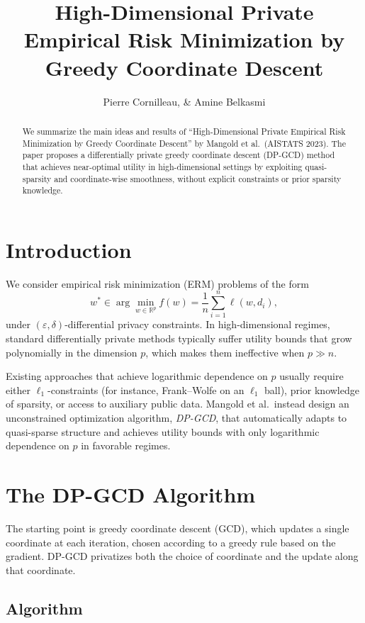 \documentclass[11pt,a4paper]{article}
\title{High-Dimensional Private Empirical Risk Minimization by Greedy Coordinate Descent}
\author{Pierre Cornilleau, \& Amine Belkasmi}
\date{}
\begin{document}
\maketitle

\begin{abstract}
We summarize the main ideas and results of ``High-Dimensional Private Empirical Risk Minimization by Greedy Coordinate Descent'' by Mangold et al.\ (AISTATS 2023). The paper proposes a differentially private greedy coordinate descent (DP-GCD) method that achieves near-optimal utility in high-dimensional settings by exploiting quasi-sparsity and coordinate-wise smoothness, without explicit constraints or prior sparsity knowledge.
\end{abstract}

\section{Introduction}

We consider empirical risk minimization (ERM) problems of the form
\[
  w^* \in \arg\min_{w \in \mathbb{R}^p} f(w) = \frac{1}{n} \sum_{i=1}^n \ell(w,d_i),
\]
under \((\varepsilon,\delta)\)-differential privacy constraints. In high-dimensional regimes, standard differentially private methods typically suffer utility bounds that grow polynomially in the dimension \(p\), which makes them ineffective when \(p \gg n\).

Existing approaches that achieve logarithmic dependence on \(p\) usually require either \(\ell_1\)-constraints (for instance, Frank--Wolfe on an \(\ell_1\) ball), prior knowledge of sparsity, or access to auxiliary public data. Mangold et al.\ instead design an unconstrained optimization algorithm, \emph{DP-GCD}, that automatically adapts to quasi-sparse structure and achieves utility bounds with only logarithmic dependence on \(p\) in favorable regimes.

\section{The DP-GCD Algorithm}

The starting point is greedy coordinate descent (GCD), which updates a single coordinate at each iteration, chosen according to a greedy rule based on the gradient. DP-GCD privatizes both the choice of coordinate and the update along that coordinate.

\subsection*{Algorithm}
\end{document}
